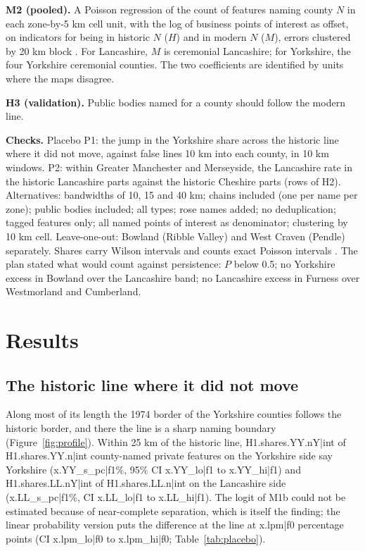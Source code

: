 \documentclass[11pt,a4paper]{article}
\begin{document}
\textbf{M2 (pooled).} A Poisson regression of the count of features naming county $N$ in each zone-by-5 km cell unit, with the log of business points of interest as offset, on indicators for being in historic $N$ ($H$) and in modern $N$ ($M$), errors clustered by 20 km block \citep{cameron2015}. For Lancashire, $M$ is ceremonial Lancashire; for Yorkshire, the four Yorkshire ceremonial counties. The two coefficients are identified by units where the maps disagree.

\textbf{H3 (validation).} Public bodies named for a county should follow the modern line.

\textbf{Checks.} Placebo P1: the jump in the Yorkshire share across the historic line where it did not move, against false lines 10 km into each county, in 10 km windows. P2: within Greater Manchester and Merseyside, the Lancashire rate in the historic Lancashire parts against the historic Cheshire parts (rows of H2). Alternatives: bandwidths of 10, 15 and 40 km; chains included (one per name per zone); public bodies included; all types; rose names added; no deduplication; tagged features only; all named points of interest as denominator; clustering by 10 km cell. Leave-one-out: Bowland (Ribble Valley) and West Craven (Pendle) separately. Shares carry Wilson intervals \citep{wilson1927} and counts exact Poisson intervals \citep{garwood1936}. The plan stated what would count against persistence: $P$ below 0.5; no Yorkshire excess in Bowland over the Lancashire band; no Lancashire excess in Furness over Westmorland and Cumberland.

\section{Results}\label{sec:results}
\subsection{The historic line where it did not move}
Along most of its length the 1974 border of the Yorkshire counties follows the historic border, and there the line is a sharp naming boundary (Figure~\ref{fig:profile}). Within 25 km of the historic line, {{H1.shares.YY.nY|int}} of {{H1.shares.YY.n|int}} county-named private features on the Yorkshire side say Yorkshire ({{x.YY_s_pc|f1}}\%, 95\% CI {{x.YY_lo|f1}} to {{x.YY_hi|f1}}) and {{H1.shares.LL.nY|int}} of {{H1.shares.LL.n|int}} on the Lancashire side ({{x.LL_s_pc|f1}}\%, CI {{x.LL_lo|f1}} to {{x.LL_hi|f1}}). The logit of M1b could not be estimated because of near-complete separation, which is itself the finding; the linear probability version puts the difference at the line at {{x.lpm|f0}} percentage points (CI {{x.lpm_lo|f0}} to {{x.lpm_hi|f0}}; Table~\ref{tab:placebo}).
\end{document}
